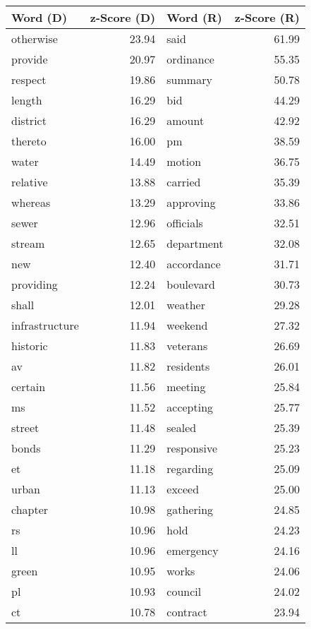 \begin{table}[ht]
\centering
\begingroup\fontsize{9pt}{10pt}\selectfont
\begin{tabular}{lrlr}
  \hline
Word (D) & z-Score (D) & Word (R) & z-Score (R) \\ 
  \hline
otherwise & 23.94 & said & 61.99 \\ 
  provide & 20.97 & ordinance & 55.35 \\ 
  respect & 19.86 & summary & 50.78 \\ 
  length & 16.29 & bid & 44.29 \\ 
  district & 16.29 & amount & 42.92 \\ 
  thereto & 16.00 & pm & 38.59 \\ 
  water & 14.49 & motion & 36.75 \\ 
  relative & 13.88 & carried & 35.39 \\ 
  whereas & 13.29 & approving & 33.86 \\ 
  sewer & 12.96 & officials & 32.51 \\ 
  stream & 12.65 & department & 32.08 \\ 
  new & 12.40 & accordance & 31.71 \\ 
  providing & 12.24 & boulevard & 30.73 \\ 
  shall & 12.01 & weather & 29.28 \\ 
  infrastructure & 11.94 & weekend & 27.32 \\ 
  historic & 11.83 & veterans & 26.69 \\ 
  av & 11.82 & residents & 26.01 \\ 
  certain & 11.56 & meeting & 25.84 \\ 
  ms & 11.52 & accepting & 25.77 \\ 
  street & 11.48 & sealed & 25.39 \\ 
  bonds & 11.29 & responsive & 25.23 \\ 
  et & 11.18 & regarding & 25.09 \\ 
  urban & 11.13 & exceed & 25.00 \\ 
  chapter & 10.98 & gathering & 24.85 \\ 
  rs & 10.96 & hold & 24.23 \\ 
  ll & 10.96 & emergency & 24.16 \\ 
  green & 10.95 & works & 24.06 \\ 
  pl & 10.93 & council & 24.02 \\ 
  ct & 10.78 & contract & 23.94 \\ 

\end{tabular}
\end{table}
